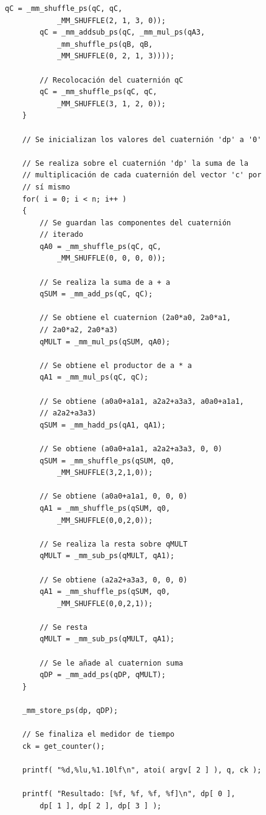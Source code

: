 \documentclass[conference]{IEEEtran}
\begin{document}
\begin{lstlisting}[style=CStyle, title=Código con la multiplicación vectorizada.]
        qC = _mm_shuffle_ps(qC, qC,
            _MM_SHUFFLE(2, 1, 3, 0));
        qC = _mm_addsub_ps(qC, _mm_mul_ps(qA3,
            _mm_shuffle_ps(qB, qB,
            _MM_SHUFFLE(0, 2, 1, 3))));

        // Recolocación del cuaternión qC
        qC = _mm_shuffle_ps(qC, qC,
            _MM_SHUFFLE(3, 1, 2, 0));
    }

    // Se inicializan los valores del cuaternión 'dp' a '0'

    // Se realiza sobre el cuaternión 'dp' la suma de la
    // multiplicación de cada cuaternión del vector 'c' por
    // sí mismo
    for( i = 0; i < n; i++ )
    {
        // Se guardan las componentes del cuaternión
        // iterado
        qA0 = _mm_shuffle_ps(qC, qC,
            _MM_SHUFFLE(0, 0, 0, 0));

        // Se realiza la suma de a + a
        qSUM = _mm_add_ps(qC, qC);

        // Se obtiene el cuaternion (2a0*a0, 2a0*a1,
        // 2a0*a2, 2a0*a3)
        qMULT = _mm_mul_ps(qSUM, qA0);

        // Se obtiene el productor de a * a
        qA1 = _mm_mul_ps(qC, qC);

        // Se obtiene (a0a0+a1a1, a2a2+a3a3, a0a0+a1a1,
        // a2a2+a3a3)
        qSUM = _mm_hadd_ps(qA1, qA1);

        // Se obtiene (a0a0+a1a1, a2a2+a3a3, 0, 0)
        qSUM = _mm_shuffle_ps(qSUM, q0,
            _MM_SHUFFLE(3,2,1,0));

        // Se obtiene (a0a0+a1a1, 0, 0, 0)
        qA1 = _mm_shuffle_ps(qSUM, q0,
            _MM_SHUFFLE(0,0,2,0));

        // Se realiza la resta sobre qMULT
        qMULT = _mm_sub_ps(qMULT, qA1);

        // Se obtiene (a2a2+a3a3, 0, 0, 0)
        qA1 = _mm_shuffle_ps(qSUM, q0,
            _MM_SHUFFLE(0,0,2,1));

        // Se resta
        qMULT = _mm_sub_ps(qMULT, qA1);

        // Se le añade al cuaternion suma
        qDP = _mm_add_ps(qDP, qMULT);
    }

    _mm_store_ps(dp, qDP);

    // Se finaliza el medidor de tiempo
    ck = get_counter();

    printf( "%d,%lu,%1.10lf\n", atoi( argv[ 2 ] ), q, ck );
    
    printf( "Resultado: [%f, %f, %f, %f]\n", dp[ 0 ],
        dp[ 1 ], dp[ 2 ], dp[ 3 ] );


\end{lstlisting}
\end{document}
